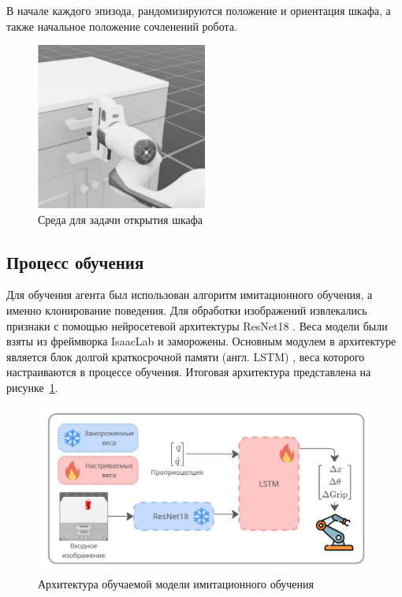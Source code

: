         В начале каждого эпизода, рандомизируются положение и ориентация шкафа, а также начальное положение сочленений робота. 

        \begin{figure}[h]
        \begin{center}
            \includegraphics[width=0.5\textwidth]{images/task1.jpg}
        \caption{Среда для задачи открытия шкафа}
        \end{center}
        \end{figure}

    \subsection{Процесс обучения}

        Для обучения агента был использован алгоритм имитационного обучения, а именно клонирование поведения. Для обработки изображений извлекались признаки с помощью нейросетевой архитектуры ResNet18 \cite{he2015deepresiduallearningimage}. Веса модели были взяты из фреймворка IsaacLab и заморожены. Основным модулем в архитектуре является блок долгой краткосрочной памяти (англ. LSTM) \cite{10.1162/neco.1997.9.8.1735}, веса которого настраиваются в процессе обучения. Итоговая архитектура представлена на рисунке~\ref{fig:bc}.

        \begin{figure}[h]
            \begin{center}
                \includegraphics[width=\textwidth]{images/bc.jpg}
            \caption{Архитектура обучаемой модели имитационного обучения}
            \label{fig:bc}
            \end{center}
        \end{figure}
        

